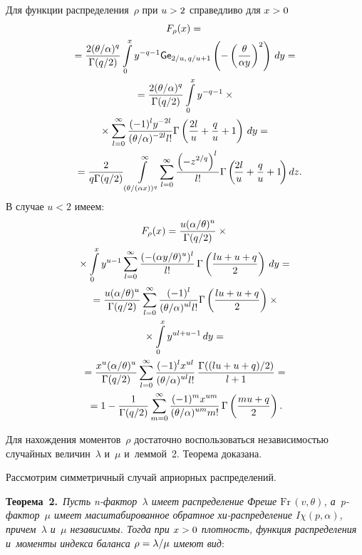 \begin{multicols}{2}
Для функции распределения~$\rho$ при $u\hm>2$ справедливо для $x\hm>0$
\begin{multline*}
F_\rho(x)
={}\\
{}=\fr{2(\theta/\alpha)^q}{\Gamma(q/2)}\int\limits_{0}^{x}  y^{-q-1}{\sf Ge}_{2/u,\, 
q/u+1}\left(-\left(\fr{\theta}{\alpha y}\right)^2\right)\,dy={}\\
{}=\fr{2(\theta/\alpha)^{q}}{\Gamma(q/2)}\int\limits_0^x { y^{-q-
1}}\times{}\\
{}\times \sum\limits_{l=0}^\infty \fr{(-1)^ly^{- 2l}}{(\theta/\alpha)^{-
2l}l!}\Gamma\left(\fr{2l}{u}+\fr{q}{u}+1\right)\, dy={}\\
{}=\fr{2}{q\Gamma(q/2)}\int\limits_{(\theta/(\alpha x))^{q}
}^\infty \hspace*{-1.84pt}
\sum\limits_{l=0}^\infty \fr{\left(-
z^{2/q}\right)^l}{l!}\Gamma\left(\!\fr{2l}{u}+\fr{q}{u}+1\!\right) dz.\hspace*{-6.7852pt}
\end{multline*}
В случае $u<2$ имеем:
\begin{multline*}
F_\rho(x) =\fr{u(\alpha/\theta)^{u}}{\Gamma(q/2)}\times{}\\
{}\times\int\limits_{0}^{x} y^{u-1}
\sum\limits_{l=0}^{\infty}\fr{(-(\alpha y/\theta)^{u})^l}{l!}\, \Gamma\left(\fr{lu 
+ u+q}{2}\right)
\, dy={}\\
{}=\fr{u (\alpha/\theta)^{u}}{\Gamma(q/2)}\sum\limits_{l=0}^\infty 
\fr{(-1)^l}{(\theta/\alpha)^{u l}l!}\Gamma\left(\fr{lu+u+q}{2}\right)\times{}\\
{}\times\int\limits_0^x 
{ y^{u l+u-1}}\, dy={}\\
{}=\fr{x^{u} (\alpha/\theta)^{u}}{\Gamma(q/2)}\sum\limits_{l=0}^\infty 
\fr{(-1)^lx^{u l}}{(\theta/\alpha)^{u l}l!}\,\fr{\Gamma((lu+u+q)/2)  }{ l+ 1}={}\\
{}=1-\fr{1}{\Gamma(q/2)}\sum\limits_{m=0}^\infty \fr{(-1)^mx^{u 
m}}{(\theta/\alpha)^{u m}m!}\,\Gamma\left(\fr{mu+q}{2}\right).
\end{multline*}

Для нахождения моментов~$\rho$ достаточно воспользоваться независимостью 
случайных величин~$\lambda$ и~$\mu$ и~леммой~2.
Теорема доказана.

\smallskip

Рассмотрим симметричный случай априорных распределений.

\smallskip

\noindent
\textbf{Теорема~2.}\
\textit{Пусть n-фак\-тор~$\lambda$ имеет распределение Фреше $\mathrm{Fr}\,(v,\theta)$, 
а~p-фак\-тор~$\mu$ имеет масштабированное обратное хи-рас\-пре\-де\-ле\-ние $I\chi(p, \alpha)$, 
причем~$\lambda$ и~$\mu$ независимы. Тогда при $x\hm>0$ плотность, функция 
распределения и~моменты индекса баланса $\rho\hm=\lambda/\mu$ имеют вид}:


\end{multicols}

